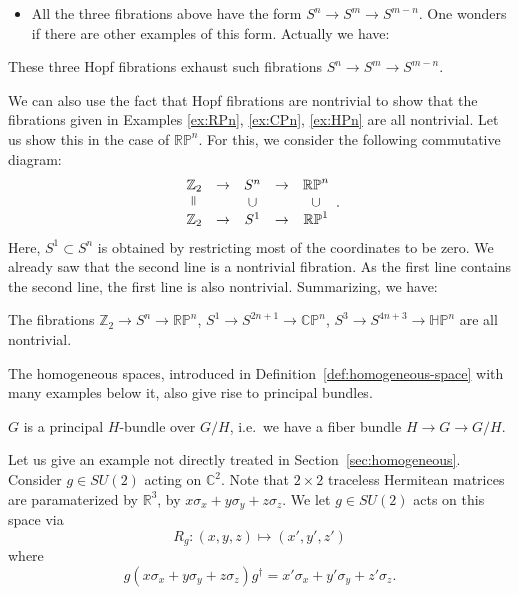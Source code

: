 \documentclass[12pt]{article}
\numberwithin{equation}{section}
\def\bC{\mathbb{C}}
\def\bR{\mathbb{R}}
\def\bZ{\mathbb{Z}}
\def\RP{\mathbb{RP}}
\def\CP{\mathbb{CP}}
\def\HP{\mathbb{HP}}
\begin{document}
\begin{itemize}
\item All the three fibrations above have the form
$S^n \to S^m \to S^{m-n}$.
One wonders if there are other examples of this form.
Actually we have:
\end{itemize}

\begin{fact}
These three Hopf fibrations exhaust 
such fibrations $S^n\to S^m\to S^{m-n}$.
\end{fact}

We can also use the fact that Hopf fibrations are nontrivial to show that
the fibrations given in Examples \ref{ex:RPn}, \ref{ex:CPn}, \ref{ex:HPn} 
are all nontrivial.
Let us show this in the case of $\RP^n$. For this, we consider the following commutative diagram:
\begin{equation}
\begin{array}{ccccc}
  \bZ_2 &\to& S^n &\to& \RP^{n}  \\
   \rotatebox{90}{$=$} & & \cup & & \cup \\
    \bZ_2 &\to& S^1 &\to& \RP^1
\end{array}.
\end{equation}
Here, $S^1\subset S^n$ is obtained by restricting most of the coordinates to be zero.
We already saw that the second line is a nontrivial fibration.
As the first line contains the second line, the first line is also nontrivial.
Summarizing, we have: 
\begin{proposition}
  \label{prop:nontriviality-projective-fibration}
  The fibrations $\bZ_2\to S^n\to \RP^n$,
  $S^1\to S^{2n+1}\to \CP^n$,
  $S^3\to S^{4n+3}\to \HP^n$
  are all nontrivial.
\end{proposition}

The homogeneous spaces, introduced in Definition~\ref{def:homogeneous-space}
with many examples below it,
also give rise to principal bundles.
\begin{proposition}
  $G$ is a principal $H$-bundle over $G/H$, i.e.~we have a fiber bundle $H\to G\to G/H$.
\end{proposition}

Let us give an example not directly treated in Section~\ref{sec:homogeneous}.
Consider $g\in SU(2)$ acting on $\bC^2$.
Note that $2\times 2$ traceless Hermitean matrices are paramaterized by $\bR^3$,
by $x\sigma_x+y\sigma_y+z\sigma_z$.
We let $g\in SU(2)$ acts on this space via \begin{equation}
R_g: (x,y,z) \mapsto (x',y',z')  \label{eq:Rg1}
\end{equation} where \begin{equation}
g(x\sigma_x+y\sigma_y+z\sigma_z)g^\dagger = x'\sigma_x+y'\sigma_y+z'\sigma_z.
\label{eq:Rg2}
\end{equation}
\end{document}
